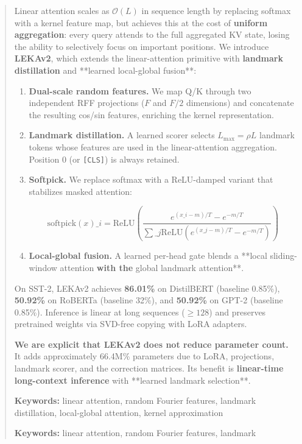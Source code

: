 \documentclass{article}
\begin{document}
\maketitle

\begin{abstract}
Linear attention scales as $\mathcal{O}(L)$ in sequence length by replacing 
softmax with a kernel feature map, but achieves this at the cost of 
\textbf{uniform aggregation}: every query attends to the full aggregated 
KV state, losing the ability to selectively focus on important 
positions. We introduce \textbf{LEKAv2}, which extends the linear-attention 
primitive with \textbf{landmark distillation} and **learned local-global 
fusion**:

\begin{enumerate}
\item \textbf{Dual-scale random features.} We map Q/K through two independent
  RFF projections ($F$ and $F/2$ dimensions) and concatenate the
  resulting cos/sin features, enriching the kernel representation.
\item \textbf{Landmark distillation.} A learned scorer selects $L_\text{max} = \rho L$
  landmark tokens whose features are used in the linear-attention
  aggregation. Position 0 (or \texttt{[CLS]}) is always retained.
\item \textbf{Softpick.} We replace softmax with a ReLU-damped variant that
  stabilizes masked attention:
  
  $$
  \text{softpick}(x)\_i = \text{ReLU}\!\left(\frac{e^{(x\_i - m)/T} - e^{-m/T}}{\sum\_j \text{ReLU}(e^{(x\_j - m)/T} - e^{-m/T})}\right)
  $$
\item \textbf{Local-global fusion.} A learned per-head gate blends a **local
  sliding-window attention\textbf{ with the }global landmark attention**.

\end{enumerate}
On SST-2, LEKAv2 achieves \textbf{86.01\%} on DistilBERT (baseline 
0.85\%), \textbf{50.92\%} on RoBERTa (baseline 32\%), and 
\textbf{50.92\%} on GPT-2 (baseline 0.85\%). Inference is linear at 
long sequences ($\geq 128$) and preserves pretrained weights 
via SVD-free copying with LoRA adapters.

\textbf{We are explicit that LEKAv2 does not reduce parameter count.} It adds 
approximately 66.4M\% parameters due to LoRA, projections, 
landmark scorer, and the correction matrices. Its benefit is 
\textbf{linear-time long-context inference} with **learned landmark 
selection**.

\textbf{Keywords:} linear attention, random Fourier features, landmark 
distillation, local-global attention, kernel approximation



\vspace{0.5em}
\noindent\textbf{Keywords:} linear attention, random Fourier features, landmark
\end{abstract}
\end{document}
